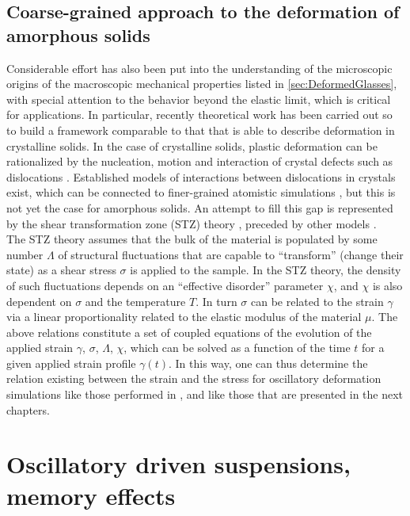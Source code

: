 \subsection{Coarse-grained approach to the deformation of amorphous solids}
Considerable effort has also been put into the understanding of the microscopic origins of the macroscopic mechanical properties listed in \autoref{sec:DeformedGlasses}, with special attention to the behavior beyond the elastic limit, which is critical for applications. In particular, recently theoretical work has been carried out so to build a framework comparable to that that is able to describe deformation in crystalline solids. In the case of crystalline solids, plastic deformation can be rationalized by the nucleation, motion and interaction of crystal defects such as dislocations \cite{phillips1999hierarchical, shilkrot2002coupled}. Established models of interactions between dislocations in crystals exist, which can be connected to finer-grained atomistic simulations \cite{bulatov1998connecting}, but this is not yet the case for amorphous solids. An attempt to fill this gap is represented by the shear transformation zone (STZ) theory \cite{langer2006shear}, preceded by other models \cite{argon1979plastic, spaepen1977microscopic}.\\
The STZ theory assumes that the bulk of the material is populated by some number $\Lambda$ of structural fluctuations that are capable to ``transform'' (change their state) as a shear stress $\sigma$ is applied to the sample. In the STZ theory, the density of such fluctuations depends on an ``effective disorder'' parameter $\chi$, and $\chi$ is also dependent on $\sigma$ and the temperature $T$. In turn $\sigma$ can be related to the strain $\gamma$ via a linear proportionality related to the elastic modulus of the material $\mu$.
The above relations constitute a set of coupled equations of the evolution of the applied strain $\gamma$, $\sigma$, $\Lambda$, $\chi$, which can be solved as a function of the time $t$ for a given applied strain profile $\gamma(t)$. In this way, one can thus determine \cite{bouchbinder2013private} the relation existing between the strain and the stress for oscillatory deformation simulations like those performed in \cite{lacks2004energy}, and like those that are presented in the next chapters.

\section{Oscillatory driven suspensions, memory effects}

